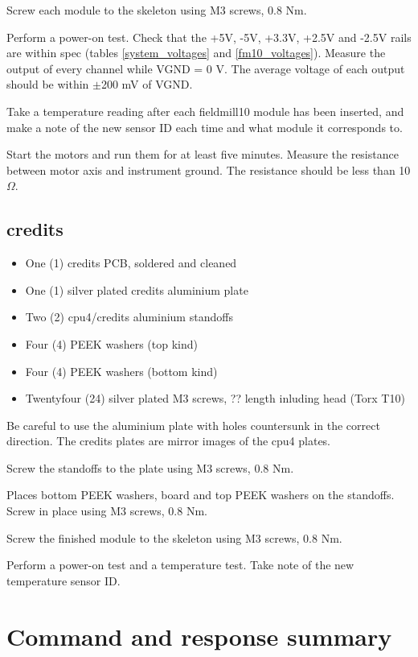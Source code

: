 \documentclass{article}
\begin{document}
Screw each module to the skeleton using M3 screws, 0.8 Nm.

Perform a power-on test.
Check that the +5V, -5V, +3.3V, +2.5V and -2.5V rails are within spec (tables \ref{system_voltages} and \ref{fm10_voltages}).
Measure the output of every channel while VGND = 0 V. The average voltage of each output should be within $\pm$200 mV of VGND.

Take a temperature reading after each fieldmill10 module has been inserted,
and make a note of the new sensor ID each time and what module it corresponds to.

Start the motors and run them for at least five minutes.
Measure the resistance between motor axis and instrument ground.
The resistance should be less than 10 $\Omega$.

\subsection{credits}

\begin{itemize}
\item One (1) credits PCB, soldered and cleaned
\item One (1) silver plated credits aluminium plate
\item Two (2) cpu4/credits aluminium standoffs
\item Four (4) PEEK washers (top kind)
\item Four (4) PEEK washers (bottom kind)
\item Twentyfour (24) silver plated M3 screws, ?? length inluding head (Torx T10)
\end{itemize}

Be careful to use the aluminium plate with holes countersunk in the correct direction.
The credits plates are mirror images of the cpu4 plates.

Screw the standoffs to the plate using M3 screws, 0.8 Nm.

Places bottom PEEK washers, board and top PEEK washers on the standoffs.
Screw in place using M3 screws, 0.8 Nm.

Screw the finished module to the skeleton using M3 screws, 0.8 Nm.

Perform a power-on test and a temperature test.
Take note of the new temperature sensor ID.

\newpage
\section{Command and response summary}
\end{document}

